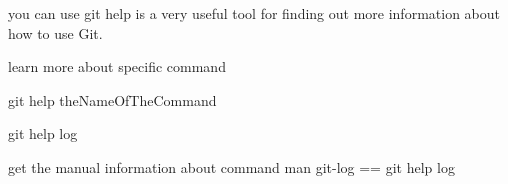 you can use  
  git help 
    is a very useful tool for finding out more information about how to use Git.

learn more about specific command 

git help theNameOfTheCommand

git help log

get the manual information about command
man git-log    ==   git help log  